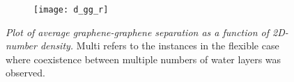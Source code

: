 \documentclass[12pt]{article}
\begin{document}





\begin{figure}[h!]
	\centering
	\begin{subfigure}[b]{0.39\textwidth}
    		\texttt{[image: d\_gg\_r]}
  	\end{subfigure}
	\caption{\textit{Plot of average graphene-graphene separation as a function of 2D-number density.} Multi refers to the instances in the flexible case where coexistence between multiple numbers of water layers was observed.}
	\label{fig:dgg_1}
\end{figure}
\end{document}

